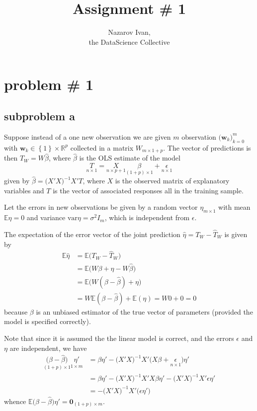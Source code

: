 \documentclass[a4paper]{article}
\title{Assignment \# 1}
\author{Nazarov Ivan, \rus{101мНОД(ИССА)}\\the DataScience Collective}
\newcommand{\obj}[1]{{\left\{ #1 \right \}}}
\newcommand{\w}{\mathbf{w}}
\newcommand{\Real}{\mathbb{R}}
\newcommand{\Ex}{\mathbb{E}}
\newcommand{\Var}{\text{var}}
\begin{document}
\maketitle

\section{problem \# 1} %
\label{sec:problem_1}

\subsection{subproblem a} %
\label{sub:subproblem_a}

Suppose instead of a one new observation we are given $m$ observation
$\big(\w_k\big)_{k=0}^m$ with $\w_k\in \obj{1}\times\Real^p$
collected in a matrix $W_{m\times 1+p}$. The vector of predictions
is then $\hat{T}_W = W\hat{\beta}$, where $\hat{\beta}$ is the OLS estimate of
the model
\[ \underset{n\times 1}{T} = \underset{n\times p+1}{X} \underset{(1+p)\times 1}{\beta} + \underset{n\times 1}{\epsilon}\]
given by $\hat{\beta} = \big(X'X\big)^{-1} X'T$, where $X$ is the observed matrix of explanatory variables and $T$ is the vector of associated responses
all in the training sample.

Let the errors in new observations be given by a random vector $\eta_{m\times 1}$ with mean $\Ex \eta = 0$ and variance $\Var \eta = \sigma^2 I_m$,
which is independent from $\epsilon$.

The expectation of the error vector of the joint prediction $\hat{\eta} = T_W - \hat{T}_W$ is given by
\begin{align*}
	\Ex \hat{\eta} &= \Ex\Big( T_W - \hat{T}_W \Big) \\
	&= \Ex\Big( W\beta + \eta - W\hat{\beta} \Big) \\
	&= \Ex\Big( W (\beta - \hat{\beta}) + \eta \Big) \\
	&= W \Ex(\beta - \hat{\beta}) + \Ex(\eta) = W 0 + 0 = 0
\end{align*}
because $\beta$ is an unbiased estimator of the true vector of parameters
(provided the model is specified correctly).

Note that since it is assumed the the linear model is correct, and the errors
$\epsilon$ and $\eta$ are independent, we have
\begin{align*}
	\underset{(1+p)\times 1}{\big(\beta-\hat{\beta}\big)}\underset{1\times m}{\eta'}
	&= \beta\eta' - \big(X'X\big)^{-1} X'\big(X\beta + \underset{n\times 1}{\epsilon}) \eta' \\
	&= \beta\eta' - \big(X'X\big)^{-1} X'X\beta\eta' - \big(X'X\big)^{-1} X'\epsilon \eta' \\
	&=  - \big(X'X\big)^{-1} X' \big( \epsilon \eta' \big)
\end{align*}
whence $\Ex \big(\beta-\hat{\beta}\big)\eta' = \mathbf{0}_{(1+p)\times m}$.
\end{document}

